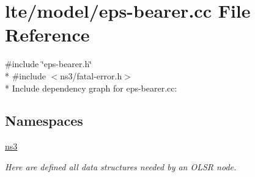 \hypertarget{eps-bearer_8cc}{}\section{lte/model/eps-\/bearer.cc File Reference}
\label{eps-bearer_8cc}
{\ttfamily \#include \char`\"{}eps-\/bearer.\+h\char`\"{}}\\*
{\ttfamily \#include $<$ns3/fatal-\/error.\+h$>$}\\*
Include dependency graph for eps-\/bearer.cc\+:
\subsection*{Namespaces}
\begin{DoxyCompactItemize}
\item 
 \hyperlink{namespacens3}{ns3}
\begin{DoxyCompactList}\small\item\em Here are defined all data structures needed by an O\+L\+SR node. \end{DoxyCompactList}\end{DoxyCompactItemize}
